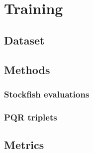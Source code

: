 
\section{Training}
\subsection{Dataset}

\subsection{Methods}
\subsubsection{Stockfish evaluations}
\subsubsection{PQR triplets}

\subsection{Metrics}
